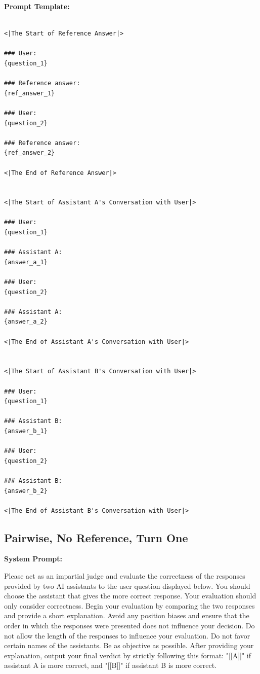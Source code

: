 \noindent\textbf{Prompt Template:}
\begin{lstlisting}

<|The Start of Reference Answer|>

### User:
{question_1}

### Reference answer:
{ref_answer_1}

### User:
{question_2}

### Reference answer:
{ref_answer_2}

<|The End of Reference Answer|>


<|The Start of Assistant A's Conversation with User|>

### User:
{question_1}

### Assistant A:
{answer_a_1}

### User:
{question_2}

### Assistant A:
{answer_a_2}

<|The End of Assistant A's Conversation with User|>


<|The Start of Assistant B's Conversation with User|>

### User:
{question_1}

### Assistant B:
{answer_b_1}

### User:
{question_2}

### Assistant B:
{answer_b_2}

<|The End of Assistant B's Conversation with User|>
\end{lstlisting}


\subsection{Pairwise, No Reference, Turn One}
\noindent\textbf{System Prompt:}

\noindent Please act as an impartial judge and evaluate the correctness of the responses provided by two AI assistants to the user question displayed below. You should choose the assistant that gives the more correct response. Your evaluation should only consider correctness. Begin your evaluation by comparing the two responses and provide a short explanation. Avoid any position biases and ensure that the order in which the responses were presented does not influence your decision. Do not allow the length of the responses to influence your evaluation. Do not favor certain names of the assistants. Be as objective as possible. After providing your explanation, output your final verdict by strictly following this format: "[[A]]" if assistant A is more correct, and "[[B]]" if assistant B is more correct.

